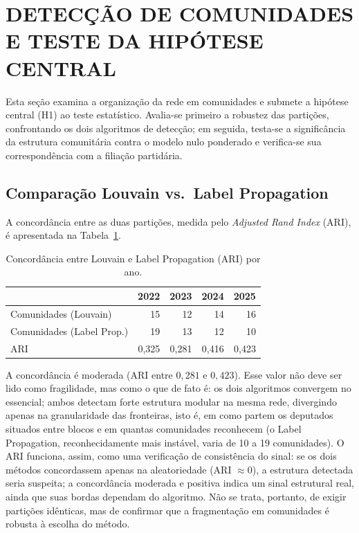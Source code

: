 \documentclass[
      12pt,
      a4paper,
      openright,
      oneside,
      chapter=TITLE,
      section=TITLE,
      english,
      french,
      spanish,
      brazilian
    ]{abntex2}
\begin{document}
    \section{DETECÇÃO DE COMUNIDADES E TESTE DA HIPÓTESE CENTRAL}

    Esta seção examina a organização da rede em comunidades e submete a hipótese central (H1) ao teste estatístico. Avalia-se primeiro a robustez das partições, confrontando os dois algoritmos de detecção; em seguida, testa-se a significância da estrutura comunitária contra o modelo nulo ponderado e verifica-se sua correspondência com a filiação partidária.

    \subsection{Comparação Louvain vs.\ Label Propagation}
    
    A concordância entre as duas partições, medida pelo \textit{Adjusted Rand Index} (ARI), é apresentada na Tabela~\ref{tab:ari}.
    
    \begin{table}[H]
    \centering
    \caption{Concordância entre Louvain e Label Propagation (ARI) por ano.}
    \label{tab:ari}
    \begin{tabular}{lrrrr}
    \toprule
     & \textbf{2022} & \textbf{2023} & \textbf{2024} & \textbf{2025} \\
    \midrule
    Comunidades (Louvain)          & 15    & 12    & 14    & 16    \\
    Comunidades (Label Prop.)      & 19    & 13    & 12    & 10    \\
    ARI                            & 0,325 & 0,281 & 0,416 & 0,423 \\
    \bottomrule
    \end{tabular}
    \end{table}
    
    A concordância é moderada (ARI entre $0{,}281$ e $0{,}423$). Esse valor não deve ser lido como fragilidade, mas como o que de fato é: os dois algoritmos convergem no essencial; ambos detectam forte estrutura modular na mesma rede, divergindo apenas na granularidade das fronteiras, isto é, em como partem os deputados situados entre blocos e em quantas comunidades reconhecem (o Label Propagation, reconhecidamente mais instável, varia de 10 a 19 comunidades). O ARI funciona, assim, como uma verificação de consistência do sinal: se os dois métodos concordassem apenas na aleatoriedade (ARI $\approx 0$), a estrutura detectada seria suspeita; a concordância moderada e positiva indica um sinal estrutural real, ainda que suas bordas dependam do algoritmo. Não se trata, portanto, de exigir partições idênticas, mas de confirmar que a fragmentação em comunidades é robusta à escolha do método.
    
\end{document}
